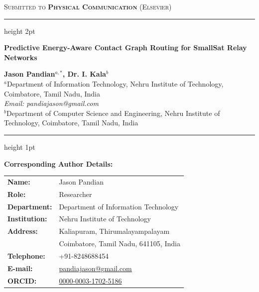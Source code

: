 \documentclass[11pt]{article}
\begin{document}
\thispagestyle{empty}

\begin{center}
    \vspace*{0.2in}
    {\large\scshape Submitted to \textbf{Physical Communication} (Elsevier)}\\[0.15in]
    \textcolor{elsevierblue}{\hrule height 2pt}
    \vspace*{0.3in}
    
    {\LARGE\bfseries\boldmath Predictive Energy-Aware Contact Graph Routing for SmallSat Relay Networks\par}
    \vspace*{0.4in}
    
    {\large\bfseries Jason Pandian$^{a,*}$, Dr. I. Kala$^{b}$}\\[0.2in]
    
    {\small
    $^{a}$Department of Information Technology, Nehru Institute of Technology, Coimbatore, Tamil Nadu, India\\
    \textit{Email: pandiajason@gmail.com}\\[0.15in]
    $^{b}$Department of Computer Science and Engineering, Nehru Institute of Technology, Coimbatore, Tamil Nadu, India\\
    }
\end{center}

\vspace*{0.5in}
\textcolor{elsevierblue}{\hrule height 1pt}
\vspace*{0.2in}

{\large\bfseries Corresponding Author Details:}\\[0.15in]
\begin{tabular}{ll}
    \textbf{Name:} & Jason Pandian \\
    \textbf{Role:} & Researcher \\
    \textbf{Department:} & Department of Information Technology \\
    \textbf{Institution:} & Nehru Institute of Technology \\
    \textbf{Address:} & Kaliapuram, Thirumalayampalayam \\
    & Coimbatore, Tamil Nadu, 641105, India \\
    \textbf{Telephone:} & +91-8248688454 \\
    \textbf{E-mail:} & \href{mailto:pandiajason@gmail.com}{pandiajason@gmail.com} \\
    \textbf{ORCID:} & \href{https://orcid.org/0000-0003-1702-5186}{0000-0003-1702-5186} \\
\end{tabular}
\end{document}
